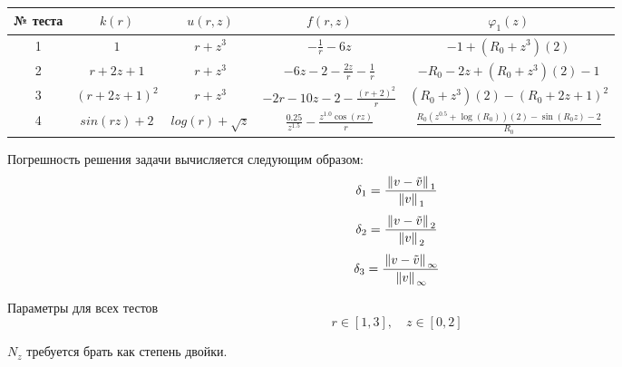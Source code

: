 \begin{center}
  \begin{tabular}{c|c c|c c}
  \toprule
  № теста & $k(r)$ & $u(r, z)$ & $f(r, z)$ & $\varphi_1(z)$ \\
  \midrule
  1 & $ 1 $ & $r + z^3$ & $- \frac{1}{r} - 6 z$ & $- 1 + \left(R_{0} + z^{3}\right) \left(2\right)$ \\
  2 & $ r + 2z + 1 $ & $r + z^3$ & $- 6 z - 2 - \frac{2 z}{r} - \frac{1}{r}$ & $- R_{0} - 2 z + \left(R_{0} + z^{3}\right) \left(2\right) - 1$ \\
  3 & $ (r + 2z + 1)^2 $ & $r + z^3$ & $- 2 r - 10 z - 2 - \frac{\left(r + 2\right)^{2}}{r}$ & $\left(R_{0} + z^{3}\right) \left(2\right) - \left(R_{0} + 2 z + 1\right)^{2}$ \\
  4 & $ sin(rz) + 2 $ & $log(r) + \sqrt{z}$ & $\frac{0.25}{z^{1.5}} - \frac{z^{1.0} \cos{\left(r z \right)}}{r}$ & $\frac{R_{0} \left(z^{0.5} + \log{\left(R_{0} \right)}\right) \left(2\right) - \sin{\left(R_{0} z \right)} - 2}{R_{0}}$ \\
  \bottomrule
  \end{tabular}
\end{center}

Погрешность решения задачи вычисляется следующим образом:
\[ \delta_1 = \frac{\left. \|v - \Tilde{v}\| \right._1}{\left. \|v\| \right._1} \]
\[ \delta_2 = \frac{\left. \|v - \Tilde{v}\| \right._2}{\left. \|v\| \right._2} \]
\[ \delta_3 = \frac{\left. \|v - \Tilde{v}\| \right._\infty}{\left. \|v\| \right._\infty} \]

Параметры для всех тестов
\[ r \in [1, 3], \quad z \in [0, 2] \]

$N_z$ требуется брать как степень двойки.

